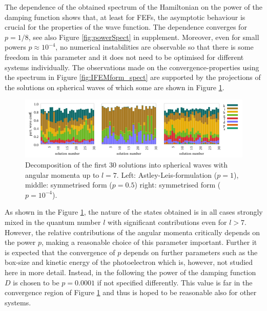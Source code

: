 The dependence of the obtained spectrum of the Hamiltonian on the power of the damping function shows that, at least for FEFs, the asymptotic behaviour is crucial for the properties of the wave function. 
The dependence converges for $p=1/8$, see also Figure \ref{fig:powerSpect} in supplement.
Moreover, even for small powers $p\approx 10^{-4}$, no numerical instabilities are observable so that there is some freedom in this parameter and it does not need to be optimised for different systems individually.
The observations made on the convergence-properties using the spectrum in Figure \ref{fig:IFEMform_spect} are supported by the projections of the solutions on spherical waves of which some are shown in Figure \ref{fig:IFEMform_project}.
\begin{figure}
\includegraphics[width=\textwidth]{Figures/Ifem_forms}
\caption{Decomposition of the first 30 solutions into spherical waves with angular momenta up to $l=7$.
Left: Astley-Leis-formulation ($p=1$), middle: symmetrised form ($p=0.5$) right: symmetrised form ($p=10^{-4}$).}
\label{fig:IFEMform_project}
\end{figure}

As shown in the Figure \ref{fig:IFEMform_project}, the nature of the states obtained is in all cases strongly mixed in the quantum number $l$ with significant contributions even for $l>7$.
However, the relative contributions of the angular momenta critically depends on the power $p$, making a reasonable choice of this parameter important.
Further it is expected that the convergence of $p$ depends on further parameters such as the box-size and kinetic energy of the photoelectron which is, however, not studied here in more detail.
Instead, in the following the power of the damping function $D$ is chosen to be $p=0.0001$ if not specified differently.
This value is far in the convergence region of Figure \ref{fig:IFEMform_project} and thus is hoped to be reasonable also for other systems.

